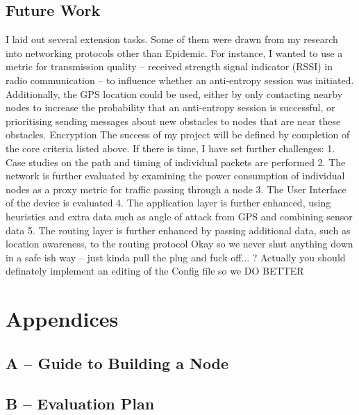 \documentclass[12pt,a4paper]{report}
\begin{document}
\section{Future Work}
I laid out several extension tasks. Some of them were drawn from my research into networking protocols other than Epidemic. For instance, I wanted to use a metric for transmission quality -- received strength signal indicator (RSSI) in radio communication -- to influence whether an anti-entropy session was initiated. Additionally, the GPS location could be used, either by only contacting nearby nodes to increase the probability that an anti-entropy session is successful, or prioritising sending messages about new obstacles to nodes that are near these obstacles. 
Encryption 
The success of my project will be defined by completion of the core criteria listed above. If there is
time, I have set further challenges:
1. Case studies on the path and timing of individual packets are performed
2. The network is further evaluated by examining the power consumption of individual nodes as
a proxy metric for traffic passing through a node
3. The User Interface of the device is evaluated
4. The application layer is further enhanced, using heuristics and extra data such as angle of
attack from GPS and combining sensor data
5. The routing layer is further enhanced by passing additional data, such as location awareness,
to the routing protocol
Okay so we never shut anything down in a safe ish way -- just kinda pull the plug and fuck off... ? Actually you should definately implement an editing of the Config file so we DO BETTER






\chapter*{Appendices}

\section*{A -- Guide to Building a Node}
\label{appendixA}
\setcounter{chapter}{0}
\setcounter{figure}{0}

\newpage
\section*{B -- Evaluation Plan}
\label{appendixB}
\setcounter{figure}{0}

\end{document}
